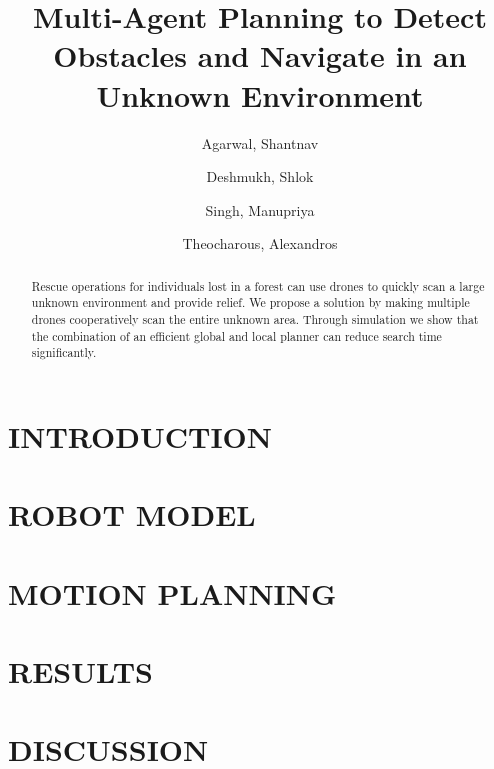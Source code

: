 \documentclass[a4paper, 11pt, conference]{ieeeconf}      %
\title{\LARGE \bf Multi-Agent Planning to Detect Obstacles and Navigate in an Unknown Environment}
\author{
  Agarwal, Shantnav\\
  \text{5939933}
  \and
  Deshmukh, Shlok\\
  \text{5928516}
  \and
  Singh, Manupriya\\
  \text{6050425}
  \and
  Theocharous, Alexandros\\
  \text{5930901}
}
\begin{document}
\maketitle
\thispagestyle{empty}
\pagestyle{empty}


\begin{abstract}
 Rescue operations for individuals lost in a forest can use drones to quickly scan a large unknown environment and provide relief.
 We propose a solution by making multiple drones cooperatively scan the entire unknown area. Through simulation we show that the combination of an efficient global and local planner can reduce search time significantly.
\end{abstract}

\section{INTRODUCTION}

\section{ROBOT MODEL}
 
\section{MOTION PLANNING}


\section{RESULTS}

\section{DISCUSSION}
  
 

\addtolength{\textheight}{-12cm}  %










\printbibliography
\end{document}
